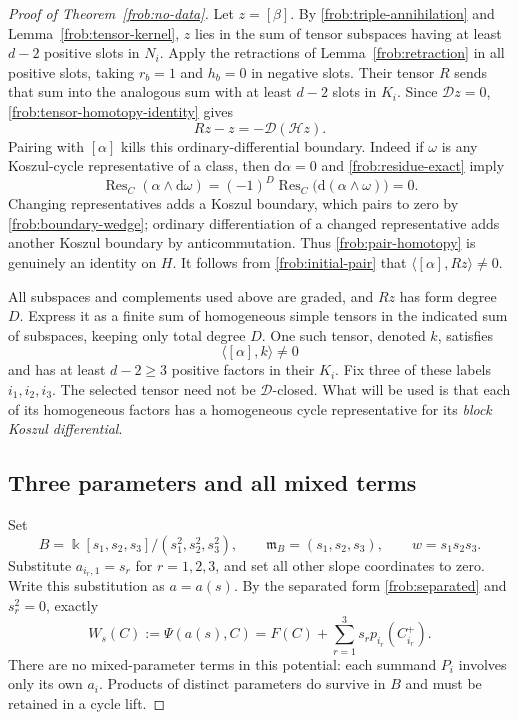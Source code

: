 \begin{proof}[Proof of Theorem~\ref{frob:no-data}]
Let $z=[\beta]$.  By \eqref{frob:triple-annihilation} and
Lemma~\ref{frob:tensor-kernel}, $z$ lies in the sum of tensor subspaces
having at least $d-2$ positive slots in $N_i$.  Apply the retractions
of Lemma~\ref{frob:retraction} in all positive slots, taking $r_b=1$
and $h_b=0$ in negative slots.  Their tensor $R$ sends that sum into
the analogous sum with at least $d-2$ slots in $K_i$.
Since $\mathcal Dz=0$, \eqref{frob:tensor-homotopy-identity} gives
\[
                           Rz-z=-\mathcal D(\mathcal H z).
\]
Pairing with $[\alpha]$ kills this ordinary-differential boundary.
Indeed if $\omega$ is any Koszul-cycle representative of a class,
then $\mathrm d\alpha=0$ and \eqref{frob:residue-exact} imply
\begin{equation}
 \operatorname{Res}_C(\alpha\wedge\mathrm d\omega)
       =(-1)^D\operatorname{Res}_C\bigl(\mathrm d(\alpha\wedge\omega)\bigr)
       =0.
 \label{frob:pair-homotopy}
\end{equation}
Changing representatives adds a Koszul boundary, which pairs to zero
by \eqref{frob:boundary-wedge}; ordinary differentiation of a changed
representative adds another Koszul boundary by anticommutation.
Thus \eqref{frob:pair-homotopy} is genuinely an identity on $H$.
It follows from \eqref{frob:initial-pair} that
$\langle[\alpha],Rz\rangle\ne0$.

All subspaces and complements used above are graded, and $Rz$ has
form degree $D$.  Express it as a finite sum of homogeneous simple
tensors in the indicated sum of subspaces, keeping only total degree
$D$.  One such tensor, denoted $k$, satisfies
\begin{equation}
             \langle[\alpha],k\rangle\ne0
 \label{frob:selected-pair}
\end{equation}
and has at least $d-2\geq3$ positive factors in their $K_i$.
Fix three of these labels $i_1,i_2,i_3$.  The selected tensor need
not be $\mathcal D$-closed.  What will be used is that each of its
homogeneous factors has a homogeneous cycle representative for its
\emph{block Koszul differential}.

\subsection{Three parameters and all mixed terms}
\label{frob:three-parameters}

Set
\begin{equation}
 B=\Bbbk[s_1,s_2,s_3]/(s_1^2,s_2^2,s_3^2),\qquad
 \mathfrak m_B=(s_1,s_2,s_3),\qquad w=s_1s_2s_3.
 \label{frob:base}
\end{equation}
Substitute $a_{i_r,1}=s_r$ for $r=1,2,3$, and set all other slope
coordinates to zero.  Write this substitution as $a=a(s)$.
By the separated form \eqref{frob:separated} and $s_r^2=0$, exactly
\begin{equation}
 W_s(C):=\Psi(a(s),C)
       =F(C)+\sum_{r=1}^3s_r p_{i_r}(C_{i_r}^+).
 \label{frob:deformed-potential}
\end{equation}
There are no mixed-parameter terms in this potential: each summand
$P_i$ involves only its own $a_i$.  Products of distinct parameters
do survive in $B$ and must be retained in a cycle lift.


\end{proof}
